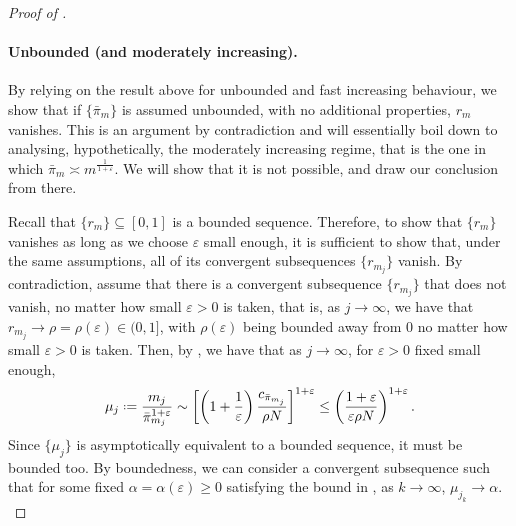 \documentclass[11pt, a4paper, twoside]{article}
\newcommand*{\defeq}{\mathrel{\vcenter{\baselineskip0.5ex \lineskiplimit0pt
			\hbox{\scriptsize.}\hbox{\scriptsize.}}}=}
\newcommand{\eps}{\varepsilon}
\numberwithin{equation}{section}
\begin{document}
\begin{proof}[Proof of ]
    		\paragraph{Unbounded (and moderately increasing).} 
            By relying on the result above for unbounded and fast increasing behaviour, we show that if $\{\bar{\pi}_m\}$ is assumed unbounded, with no additional properties, $r_m$ vanishes. This is an argument by contradiction and will essentially boil down to analysing, hypothetically, the moderately increasing regime, that is the one in which $\bar{\pi}_m \asymp m^{\frac{1}{1+\eps}}$. We will show that it is not possible, and draw our conclusion from there.
            
            Recall that $\{ r_m \} \subseteq [0, 1]$ is a bounded sequence. Therefore, to show that $\{r_m\}$ vanishes as long as we choose $\eps$ small enough, it is sufficient to show that, under the same assumptions, all of its convergent subsequences $\{ r_{m_j} \}$ vanish. 
            By contradiction, assume that there is a convergent subsequence $\{ r_{m_j} \}$ that does not vanish, no matter how small $\eps > 0$ is taken, that is, as $j \longrightarrow \infty$, we have that $r_{m_j}\longrightarrow\rho=\rho(\eps) \in (0,1]$, with $\rho(\eps)$ being bounded away from $0$ no matter how small $\eps > 0$ is taken. 
            Then, by , we have that as $j \longrightarrow \infty$, for $\eps > 0$ fixed small enough,
    		\begin{equation}\label{alphabound}
    			\mu_j\defeq \frac{m_j}{\bar{\pi}_{m_j}^{1+\eps}}\sim\left[\left(1+\frac{1}{\eps}\right)\frac{ c_{\bar{\pi}_{m_j}}}{\rho N}\right]^{1+\eps}\le\left(\frac{1+\eps }{\eps \rho N}\right)^{1+\eps}.
    		\end{equation}
    		Since $\{\mu_j\}$ is asymptotically equivalent to a bounded sequence, it must be bounded too. 
            By boundedness, we can consider a convergent subsequence such that for some fixed $\alpha=\alpha(\eps)\ge0$ satisfying the bound in , as $k\longrightarrow\infty$, $\mu_{j_k}\longrightarrow\alpha. $


\end{proof}
\end{document}
